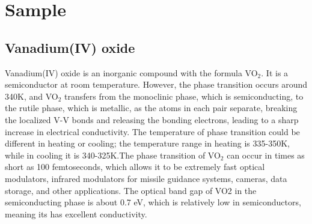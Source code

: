 \documentclass{article}
\begin{document}
\section{Sample}
\subsection{Vanadium(IV) oxide}
Vanadium(IV) oxide is an inorganic compound with the formula VO$_{2}$. It is a semiconductor at room temperature. However, the phase transition occurs around 340K, and VO$_{2}$ transfers from the monoclinic phase, which is semiconducting, to the rutile phase, which is metallic\parencite{Good71}, as the atoms in each pair separate, breaking the localized V-V bonds and releasing the bonding electrons, leading to a sharp increase in electrical conductivity\parencite{Green84}. The temperature of phase transition could be different in heating or cooling; the temperature range in heating is 335-350K, while in cooling it is 340-325K\parencite{Morin59}.The phase transition of VO$_{2}$ can occur in times as short as 100 femtoseconds, which allows it to be extremely fast optical modulators, infrared modulators for missile guidance systems, cameras, data storage, and other applications.  The optical band gap of VO2 in the semiconducting phase is about 0.7 eV\parencite{Shin90}, which is relatively low in semiconductors, meaning its has excellent conductivity.

\newpage

\printbibliography
\end{document}
